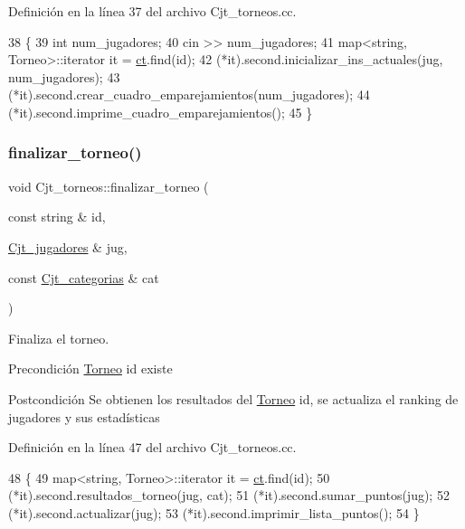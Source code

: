 Definición en la línea 37 del archivo Cjt\+\_\+torneos.\+cc.


\begin{DoxyCode}
38 \{
39     \textcolor{keywordtype}{int} num\_jugadores;
40     cin >> num\_jugadores;
41     map<string, Torneo>::iterator it = \hyperlink{class_cjt__torneos_a701df4fc4fbd2d6ffa081a01845083f3}{ct}.find(\textcolor{keywordtype}{id});
42     (*it).second.inicializar\_ins\_actuales(jug, num\_jugadores);
43     (*it).second.crear\_cuadro\_emparejamientos(num\_jugadores);
44     (*it).second.imprime\_cuadro\_emparejamientos();
45 \}
\end{DoxyCode}
\mbox{\label{class_cjt__torneos_adba857b43ab1282910fe1567dde5839f}} 
\subsubsection{\texorpdfstring{finalizar\+\_\+torneo()}{finalizar\_torneo()}}
{\footnotesize\ttfamily void Cjt\+\_\+torneos\+::finalizar\+\_\+torneo (\begin{DoxyParamCaption}\item[{const string \&}]{id,  }\item[{\hyperlink{class_cjt__jugadores}{Cjt\+\_\+jugadores} \&}]{jug,  }\item[{const \hyperlink{class_cjt__categorias}{Cjt\+\_\+categorias} \&}]{cat }\end{DoxyParamCaption})}



Finaliza el torneo. 

\begin{DoxyPrecond}{Precondición}
\hyperlink{class_torneo}{Torneo} id existe 
\end{DoxyPrecond}
\begin{DoxyPostcond}{Postcondición}
Se obtienen los resultados del \hyperlink{class_torneo}{Torneo} id, se actualiza el ranking de jugadores y sus estadísticas 
\end{DoxyPostcond}


Definición en la línea 47 del archivo Cjt\+\_\+torneos.\+cc.


\begin{DoxyCode}
48 \{
49     map<string, Torneo>::iterator it = \hyperlink{class_cjt__torneos_a701df4fc4fbd2d6ffa081a01845083f3}{ct}.find(\textcolor{keywordtype}{id});
50     (*it).second.resultados\_torneo(jug, cat);
51     (*it).second.sumar\_puntos(jug);
52     (*it).second.actualizar(jug);
53     (*it).second.imprimir\_lista\_puntos();
54 \}
\end{DoxyCode}
\mbox{\label{class_cjt__torneos_af0f18e3971687674b58d020689fa2203}} 
